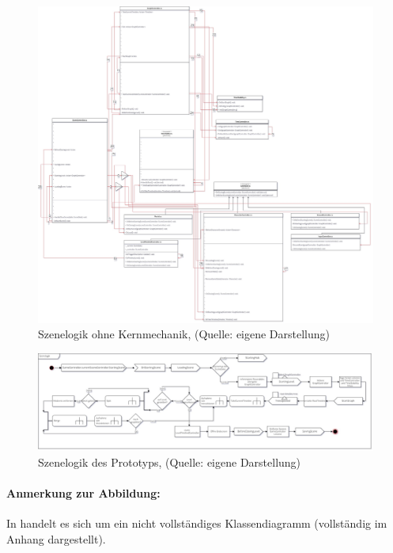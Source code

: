 \begin{figure}[ht]
\centering
\includegraphics[width=1\linewidth]{content/pictures/Level_loop_upto_character_creation.jpg}
\caption{Szenelogik ohne Kernmechanik, (Quelle: eigene Darstellung)}
\label{fig:level_game_loop_class_connectors}
\end{figure}



\begin{figure}[ht]
\centering
\includegraphics[width=1\linewidth]{content/pictures/level-loop_prototype.jpg}
\caption{Szenelogik des Prototyps, (Quelle: eigene Darstellung)}
\label{fig:level_loop_prototype}
\end{figure}
\paragraph{Anmerkung zur Abbildung:}
In  handelt es sich um ein nicht vollständiges Klassendiagramm (vollständig im Anhang dargestellt).

